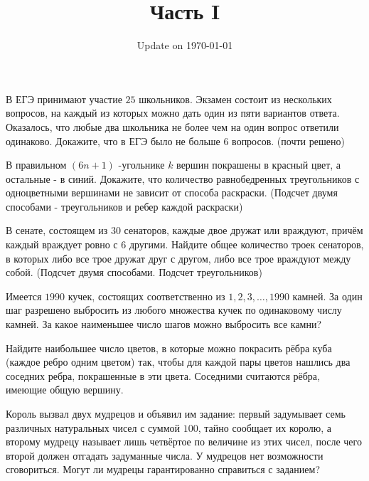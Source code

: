 \documentclass[12pt]{book}
\begin{document}
\fontsize{12}{12}\selectfont

\title{\bf \huge Часть I}
\date{Update on \today}
\maketitle 

\begin{task}
В ЕГЭ принимают участие $25$ школьников. Экзамен состоит из нескольких вопросов, на каждый из которых можно дать один из пяти вариантов ответа. Оказалось, что любые два школьника не более чем на один вопрос ответили одинаково. Докажите, что в ЕГЭ было не больше $6$ вопросов. (почти решено)
\end{task}

\begin{task}
В правильном $(6n + 1)$ -угольнике $k$ вершин покрашены в красный цвет, а остальные - в синий. Докажите, что количество равнобедренных треугольников с одноцветными вершинами не зависит от способа раскраски. (Подсчет двумя способами - треугольников и ребер каждой раскраски)
\end{task}

\begin{task}
В сенате, состоящем из $30$ сенаторов, каждые двое дружат или враждуют, причём каждый враждует ровно с $6$ другими. Найдите общее количество троек сенаторов, в которых либо все трое дружат друг с другом, либо все трое враждуют между собой. (Подсчет двумя способами. Подсчет треугольников)
\end{task}

\begin{task}
Имеется $1990$ кучек, состоящих соответственно из $1, 2, 3, \dots, 1990$ камней. За один шаг разрешено выбросить из любого множества кучек по одинаковому числу камней. За какое наименьшее число шагов можно выбросить все камни? 
\end{task}

\begin{task}
Найдите наибольшее число цветов, в которые можно покрасить рёбра куба (каждое ребро одним цветом) так, чтобы для каждой пары цветов нашлись два соседних ребра, покрашенные в эти цвета. Соседними считаются рёбра, имеющие общую вершину.
\end{task}

\begin{task}
Король вызвал двух мудрецов и объявил им задание: первый задумывает семь различных натуральных чисел с суммой $100$, тайно сообщает их королю, а второму мудрецу называет лишь четвёртое по величине из этих чисел, после чего второй должен отгадать задуманные числа. У мудрецов нет возможности сговориться. Могут ли мудрецы гарантированно справиться с заданием? 
\end{task}
\end{document}
